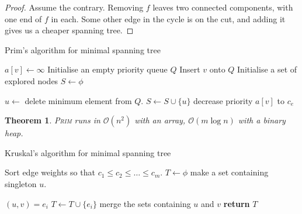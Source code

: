 \documentclass[10pt, oneside, reqno]{amsart}
\theoremstyle{plain}%
\newtheorem{thm}{Theorem}[section]
\theoremstyle{definition}
\theoremstyle{remark}
\newcommand{\bigo}[1]{\mathcal{O}(#1)}
\begin{document}
\begin{proof} Assume the contrary. Removing $f$ leaves two connected components, with one end of $f$ in each. Some other edge in the cycle is on the cut, and adding it gives us a cheaper spanning tree. 
\end{proof}

\begin{algorithm}[H]
	\label{alg:dynamic_rising_trend}
	\caption{Prim's algorithm for minimal spanning tree}
	\begin{algorithmic}[1]
			 $a[v] \gets \infty$ \EndFor
			\State Initialise an empty priority queue $Q$
			 Insert $v$ onto $Q$ \EndFor
			\State Initialise a set of explored nodes $S \gets \phi$
			
				\State $u \gets $ delete minimum element from $Q$.
				\State $S \gets S \cup \{u \}$
						\State decrease priority $a[v]$ to $c_e$
					\EndIf
				
				\EndFor
			\EndWhile
	\EndProcedure
	\end{algorithmic}
\end{algorithm}

\begin{thm}
	\textsc{Prim} runs in $\bigo{n^2}$ with an array, $\bigo{m \log n}$ with a binary heap. 
\end{thm}

\begin{algorithm}[H]
	\label{alg:dynamic_rising_trend}
	\caption{Kruskal's algorithm for minimal spanning tree}
	\begin{algorithmic}[1]
			\State Sort edge weights so that $c_1 \leq c_2 \leq \dots \leq c_m$.
			\State $T \gets \phi$
			 make a set containing singleton $u$.
			\EndFor
			
				\State $(u,v) = e_i$
					\State $T \gets T \cup \{e_i \}$
					\State merge the sets containing $u$ and $v$
				\EndIf
			\EndFor
			\State \textbf{return} $T$
		\EndProcedure
	\end{algorithmic}
\end{algorithm}


\end{document}
